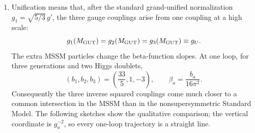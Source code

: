 \begin{enumerate}
  \begin{enumerate}
    \item[(a)]
    Unification means that, after the standard grand-unified normalization
    \(g_1=\sqrt{5/3}\,g'\), the three gauge couplings arise from one coupling
    at a high scale:
    \[
      g_1(M_{\rm GUT})=g_2(M_{\rm GUT})=g_3(M_{\rm GUT})\equiv g_U.
    \]
    The extra MSSM particles change the beta-function slopes.  At one loop,
    for three generations and two Higgs doublets,
    \[
      (b_1,b_2,b_3)=\left(\frac{33}{5},1,-3\right),
      \qquad \beta_a=\frac{b_a}{16\pi^2}.
      \tag{28.2.3}
    \]
    Consequently the three inverse squared couplings come much closer to a
    common intersection in the MSSM than in the nonsupersymmetric Standard
    Model.  The following sketches show the qualitative comparison; the
    vertical coordinate is \(g_a^{-2}\), so every one-loop trajectory is a
    straight line.
    \begin{center}
    \end{center}


\end{enumerate}
\end{enumerate}
